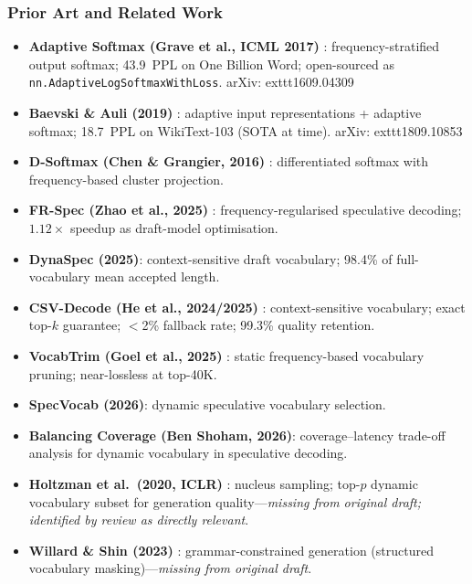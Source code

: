 \documentclass[11pt]{article}
\begin{document}
\subsubsection*{Prior Art and Related Work}
\begin{itemize}
  \item \textbf{Adaptive Softmax (Grave et al., ICML 2017)} \cite{GraveEtAl2017}: frequency-stratified output softmax; 43.9~PPL on One Billion Word; open-sourced as \texttt{nn.AdaptiveLogSoftmaxWithLoss}.
    arXiv:	exttt{1609.04309}

  \item \textbf{Baevski \& Auli (2019)} \cite{BaevskiAuli2019}: adaptive input representations + adaptive softmax; 18.7~PPL on WikiText-103 (SOTA at time).
    arXiv:	exttt{1809.10853}

  \item \textbf{D-Softmax (Chen \& Grangier, 2016)} \cite{ChenGrangier2016}: differentiated softmax with frequency-based cluster projection.

  \item \textbf{FR-Spec (Zhao et al., 2025)} \cite{ZhaoEtAl2025FRSpec}: frequency-regularised speculative decoding; $1.12\times$ speedup as draft-model optimisation.

  \item \textbf{DynaSpec (2025)}: context-sensitive draft vocabulary; 98.4\% of full-vocabulary mean accepted length.

  \item \textbf{CSV-Decode (He et al., 2024/2025)} \cite{HeEtAl2024}: context-sensitive vocabulary; exact top-$k$ guarantee; $<$2\% fallback rate; 99.3\% quality retention.

  \item \textbf{VocabTrim (Goel et al., 2025)} \cite{GoelEtAl2025}: static frequency-based vocabulary pruning; near-lossless at top-40K.

  \item \textbf{SpecVocab (2026)}: dynamic speculative vocabulary selection.

  \item \textbf{Balancing Coverage (Ben Shoham, 2026)}: coverage--latency trade-off analysis for dynamic vocabulary in speculative decoding.

  \item \textbf{Holtzman et al.\ (2020, ICLR)} \cite{HoltzmanEtAl2020}: nucleus sampling; top-$p$ dynamic vocabulary subset for generation quality---\emph{missing from original draft; identified by review as directly relevant}.

  \item \textbf{Willard \& Shin (2023)} \cite{WillardShin2023}: grammar-constrained generation (structured vocabulary masking)---\emph{missing from original draft}.
\end{itemize}
\end{document}

